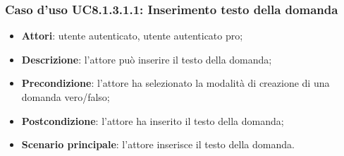 \subsubsection{Caso d'uso UC8.1.3.1.1: Inserimento testo della domanda}
	\begin{itemize}
		\item
			\textbf{Attori}: utente autenticato, utente autenticato pro;
		\item		
			\textbf{Descrizione}: l'attore può inserire il testo della domanda;
		\item
			\textbf{Precondizione}: l'attore ha selezionato la modalità di creazione di una domanda vero/falso; 
		\item
			\textbf{Postcondizione}: l'attore ha inserito il testo della domanda;
		\item
			\textbf{Scenario principale}: l'attore inserisce il testo della domanda. 
	 			
	\end{itemize}
	
